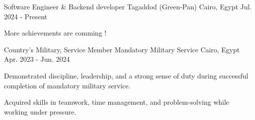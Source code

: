 

\begin{cventries}

  \cventry
    {Software Engineer \& Backend developer} %
    {Tagaddod (Green-Pan)} %
    {Cairo, Egypt} %
    {Jul. 2024 - Present} %
    {
      \begin{cvitems} %
        \item {More achievements are comming !
        }
      \end{cvitems}
    }

  \cventry
    {Country’s Military, Service Member} %
    {Mandatory Military Service} %
    {Cairo, Egypt} %
    {Apr. 2023 - Jun. 2024 } %
    {
      \begin{cvitems} %
        \item {Demonstrated discipline, leadership, and a strong sense of duty during successful completion of mandatory military service.}
        \item {Acquired skills in teamwork, time management, and problem-solving while working under pressure.}
      \end{cvitems}
    }


\end{cventries}

